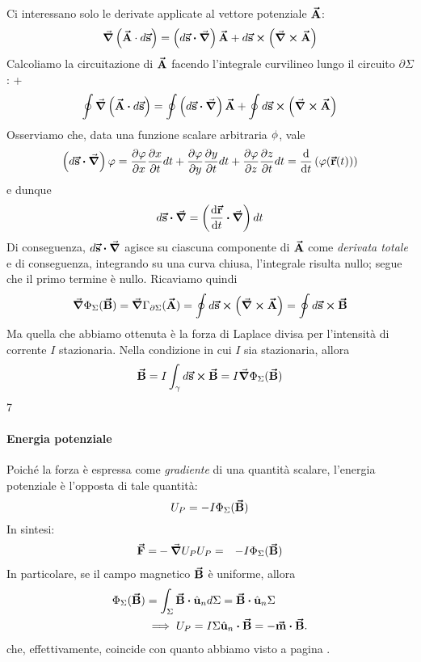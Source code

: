 Ci interessano solo le derivate applicate al vettore potenziale $\vb*{\va{A}}$:
\begin{equation*}
	\grad{\left(\vba{A}\cdot d\vba{s}\right)}=\left(d\vba{s}\vdot\grad\right)\vba{A}+d\vba{s}\cross\left(\grad\cross\vba{A}\right)
\end{equation*}
Calcoliamo la circuitazione di $\vb*{\va{A}}$ facendo l'integrale curvilineo lungo il circuito $\partial \Sigma$:
+\begin{equation}
	\oint\grad{\left(\vba{A}\vdot d\vba{s}\right)}=\oint \left(d\vba{s}\vdot\grad\right)\vba{A}+\oint d\vba{s}\cross\left(\grad\cross\vba{A}\right)
\end{equation}
Osserviamo che, data una funzione scalare arbitraria $\oldphi$, vale
\begin{equation*}
	\left(d\vba{s}\vdot\grad\right)\phi=\pdv{\phi}{x}\pdv{x}{t}dt+\pdv{\phi}{y}\pdv{y}{t}dt+\pdv{\phi}{z}\pdv{z}{t}dt=\dv{t} \left(\phi(\vba{r}(t))\right)
\end{equation*}
e dunque
\begin{equation}
	d\vba{s}\vdot\grad=\left(\dv{\vba{r}}{t}\vdot\grad\right)dt
\end{equation}
Di conseguenza, $d\vba{s}\vdot\grad$ agisce su ciascuna componente di $\vb*{\va{A}}$ come \textit{derivata totale} e di conseguenza, integrando su una curva chiusa, l'integrale risulta nullo; segue che il primo termine è nullo. Ricaviamo quindi
\begin{equation*}
	\grad{\Phi_{\Sigma}(\vb*{\va{B}})}=\grad{\Gamma_{\partial \Sigma}(\vb*{\va{A}})}=\oint d\vb*{\va{s}}\cross\left(\grad\cross\vb*{\va{A}}\right)=\oint d\vb*{\va{s}}\cross\vb*{\va{B}}
\end{equation*}
Ma quella che abbiamo ottenuta è la forza di Laplace divisa per l'intensità di corrente $I$ stazionaria. Nella condizione in cui $I$ sia stazionaria, allora
\begin{equation}
	\vb*{\va{B}}=I\int_{\gamma}d\vb*{\va{s}}\cross\vb*{\va{B}}=I\grad{\Phi_{\Sigma}(\vb*{\va{B}})}
\end{equation}7
\paragraph{Energia potenziale}
Poiché la forza è espressa come \textit{gradiente} di una quantità scalare, l'energia potenziale è l'opposta di tale quantità:
\begin{equation}
U_P=-I\Phi_{\Sigma}(\vb*{\va{B}})
\end{equation}
In sintesi:
\begin{align}
	\vb*{\va{F}}=&-\grad{U_P}
	U_P=&-I\Phi_{\Sigma}(\vb*{\va{B}})
\end{align}
In particolare, se il campo magnetico $\vb*{\va{B}}$ è uniforme, allora
\begin{align*}
	\Phi_{\Sigma}(\vba{B})&=\int_{\Sigma}\vba{B}\vdot\vbh{u}_nd\Sigma=\vba{B}\vdot\vbh{u}_n \Sigma\\
	&\implies U_P=I\Sigma \vbh{u}_n \vdot \vba{B}=-\vba{m}\vdot\vba{B}. 
\end{align*}
che, effettivamente, coincide con quanto abbiamo visto a pagina \pageref{EnergiaPotenzialeCasoGeneralemanontroppo}.
